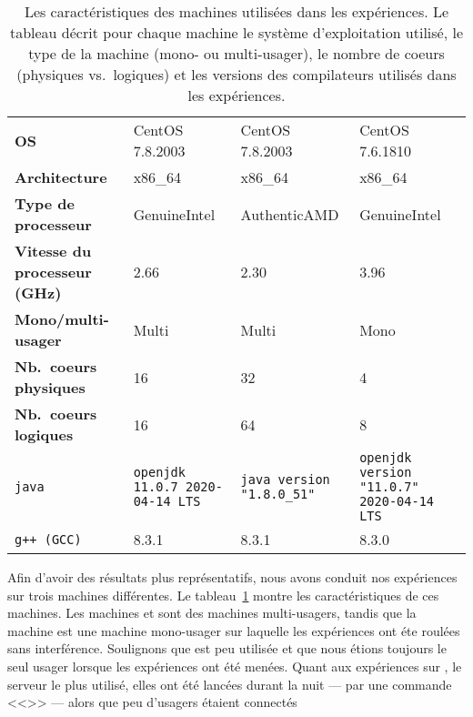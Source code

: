 

\newcommand{\LARGEUR}{3cm}

\begin{table}
\begin{tabular}{|p{3cm}|p{\LARGEUR}|p{\LARGEUR}|p{\LARGEUR}|}
\hline
  & \M1 & \M2 & \M3
\\\hline
\textbf{OS} & CentOS 7.8.2003 & CentOS 7.8.2003 & CentOS 7.6.1810
\\\hline
\textbf{Architecture} &  x86\_64 & x86\_64 & x86\_64
\\\hline
\textbf{Type de processeur} & GenuineIntel  & AuthenticAMD & GenuineIntel
\\\hline
\textbf{Vitesse du processeur (GHz)} & 2.66 & 2.30 & 3.96
\\\hline
\textbf{Mono/multi-usager} & Multi & Multi & Mono
\\\hline
\textbf{Nb.~coeurs physiques} & 16 & 32 & 4
\\\hline
\textbf{Nb.~coeurs logiques} & 16 & 64 & 8
\\\hline
\texttt{java}
  & \texttt{openjdk 11.0.7 2020-04-14 LTS}
  & \texttt{java version "1.8.0\_51"}
  & \texttt{openjdk version "11.0.7" 2020-04-14 LTS}
\\\hline
\texttt{g++ (GCC)}
   & 8.3.1
   & 8.3.1 
   & 8.3.0
\\\hline
\end{tabular}
\caption[Les caract\'eristiques des machines utilis\'ees dans les exp\'eriences.]{Les caract\'eristiques des machines utilis\'ees dans les exp\'eriences. Le tableau d\'ecrit pour chaque machine le syst\`eme d'exploitation utilis\'e, le type de la machine (mono- ou multi-usager), le nombre de coeurs (physiques vs.\ logiques) et les versions des compilateurs utilis\'es dans les exp\'eriences.}
\label{machines.table}
\end{table}


Afin d'avoir des r\'esultats plus représentatifs, nous avons conduit nos exp\'eriences sur trois machines diff\'erentes. Le tableau~\ref{machines.table} montre les caract\'eristiques de ces machines. Les machines  et  sont des machines multi-usagers, tandis que la machine  est une machine mono-usager sur laquelle les exp\'eriences ont \'et\/e roul\'ees sans interf\'erence.
%
Soulignons que  est peu utilisée et que nous étions toujours
le seul usager lorsque les expériences ont été menées. Quant aux
expériences sur , le serveur  le plus utilisé, elles
ont été lancées durant la nuit --- par une commande <<>> --- alors que peu d'usagers étaient connectés

